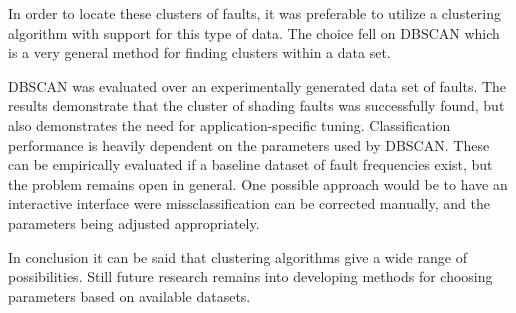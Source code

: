 In order to locate these clusters of faults, it was preferable to utilize a clustering algorithm with support for this type of data.
The choice fell on DBSCAN which is a very general method for finding clusters within a data set.

DBSCAN was evaluated over an experimentally generated data set of faults.
The results demonstrate that the cluster of shading faults was successfully found, but also demonstrates the need for application-specific tuning.
Classification performance is heavily dependent on the parameters used by DBSCAN.
These can be empirically evaluated if a baseline dataset of fault frequencies exist, but the problem remains open in general.
One possible approach would be to have an interactive interface were missclassification can be corrected manually, and the parameters being adjusted appropriately.

In conclusion it can be said that clustering algorithms give a wide range of possibilities.
Still future research remains into developing methods for choosing parameters based on available datasets.





